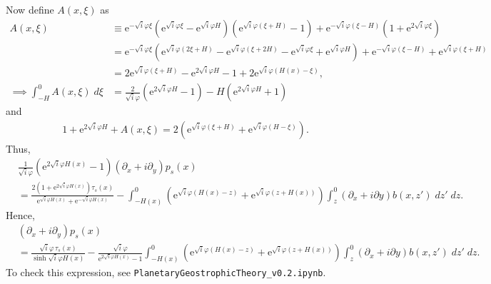 \documentclass[10pt]{amsart}
\begin{document}
Now define $A(x,\xi)$ as
\begin{align}
A(x,\xi) & \equiv \mathrm{e}^{-\sqrt{i} \varphi \xi} 
\left(
\mathrm{e}^{\sqrt{i} \varphi \xi} - 
\mathrm{e}^{\sqrt{i} \varphi H} 
\right) \left(
\mathrm{e}^{\sqrt{i} \varphi  \left( \xi + H \right)} - 1
\right) + \mathrm{e}^{-\sqrt{i} \varphi (\xi - H)  } 
\left( 1 + \mathrm{e}^{2 \sqrt{i} \varphi \xi}\right)   \nonumber \\
& =
\mathrm{e}^{-\sqrt{i} \varphi \xi} 
\left(
\mathrm{e}^{\sqrt{i} \varphi \left(2 \xi + H \right)} - 
\mathrm{e}^{\sqrt{i} \varphi \left(\xi + 2 H\right)}
- 
\mathrm{e}^{\sqrt{i} \varphi \xi} +
\mathrm{e}^{\sqrt{i} \varphi H} 
\right) + \mathrm{e}^{-\sqrt{i} \varphi (\xi - H)  }  + 
 \mathrm{e}^{\sqrt{i} \varphi \left( \xi + H \right)} \nonumber \\
& =
2 \mathrm{e}^{\sqrt{i} \varphi \left(\xi + H \right)} - 
\mathrm{e}^{2 \sqrt{i} \varphi  H}
- 
1 +
2 \mathrm{e}^{\sqrt{i} \varphi \left(H(x) - \xi\right)} 
\nonumber ,\\
\implies \int_{-H}^{0} A(x,\xi) \; d \xi & = 
\frac{2}{\sqrt{i} \varphi} \left( \mathrm{e}^{2 \sqrt{i} \varphi H} - 1 \right) -
 H \left( \mathrm{e}^{2 \sqrt{i} \varphi H} + 1 \right)
  \end{align}
  and
  \begin{align}
  1 + \mathrm{e}^{2 \sqrt{i} \varphi H} + A(x,\xi) = 
  2 \left( \mathrm{e}^{\sqrt{i} \varphi \left(\xi + H \right)} + \mathrm{e}^{\sqrt{i} \varphi \left(H - \xi\right)} \right) \nonumber .
  \end{align}
  Thus,
 \begin{align}
& 
 \frac{1}{\sqrt{i} \varphi} \left( \mathrm{e}^{2 \sqrt{i} \varphi H(x)} - 1 \right) 
 \left( \partial_x  + i \partial_y  \right) p_s (x) 
\nonumber \\
& = 
 \frac{2 \left(1 + \mathrm{e}^{2 \sqrt{i} \varphi H(x )} \right)  \tau_s (x)}{\mathrm{e}^{\sqrt{i} \varphi H(x)} + \mathrm{e}^{-\sqrt{i} \varphi H(x)}}
 -
\int_{-H(x)}^{0} 
\left( \mathrm{e}^{\sqrt{i} \varphi \left(H(x) - z\right)}  + \mathrm{e}^{\sqrt{i} \varphi \left(z + H(x) \right)} \right) 
 \int_{z}^{0} \left( \partial_x + i \partial y \right)  b(x,z') \; dz' \; dz     \nonumber .
\end{align}  
Hence,
 \begin{align}
& 
 \left( \partial_x  + i \partial_y  \right) p_s (x) 
\nonumber \\
& = 
 \frac{\sqrt{i} \varphi\, \tau_s (x)} { \sinh \sqrt{i} \varphi H(x)} 
-
  \frac{\sqrt{i} \varphi} { \mathrm{e}^{2 \sqrt{i} \varphi H(x)} - 1 }
\int_{-H(x)}^{0} 
\left( \mathrm{e}^{\sqrt{i} \varphi \left(H(x) - z\right)} + \mathrm{e}^{\sqrt{i} \varphi \left(z + H(x) \right)} \right) 
 \int_{z}^{0} \left( \partial_x + i \partial y \right)  b(x,z') \; dz' \; dz     \nonumber .
\end{align}  
To check this expression, see \texttt{PlanetaryGeostrophicTheory\_v0.2.ipynb}.
\end{document}

